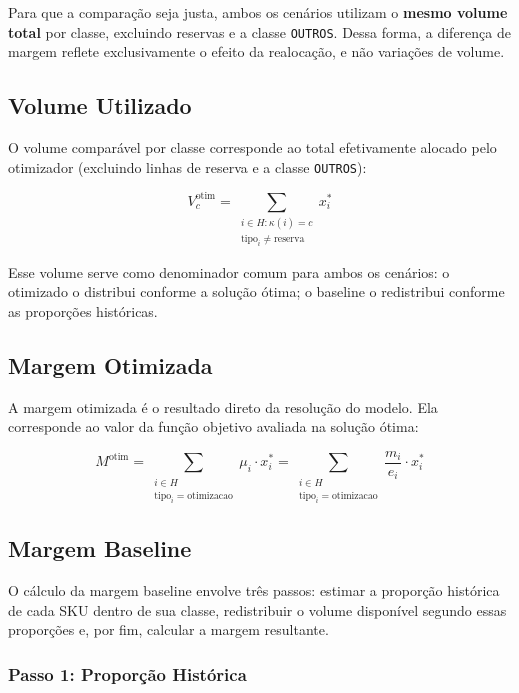 \documentclass[11pt,a4paper]{article}
\begin{document}
Para que a comparação seja justa, ambos os cenários utilizam o \textbf{mesmo
volume total} por classe, excluindo reservas e a classe \texttt{OUTROS}. Dessa
forma, a diferença de margem reflete exclusivamente o efeito da realocação, e
não variações de volume.

\subsection{Volume Utilizado}

O volume comparável por classe corresponde ao total efetivamente alocado pelo
otimizador (excluindo linhas de reserva e a classe \texttt{OUTROS}):

\begin{equation}\label{eq:auto:028}
V_c^{\text{otim}} = \sum_{\substack{i \in H : \kappa(i) = c \\ \text{tipo}_i \neq \text{reserva}}} x_i^*
\end{equation}

Esse volume serve como denominador comum para ambos os cenários: o otimizado o
distribui conforme a solução ótima; o baseline o redistribui conforme as
proporções históricas.

\subsection{Margem Otimizada}

A margem otimizada é o resultado direto da resolução do modelo. Ela corresponde
ao valor da função objetivo avaliada na solução ótima:

\begin{equation}\label{eq:auto:029}
M^{\text{otim}} = \sum_{\substack{i \in H \\ \text{tipo}_i = \text{otimizacao}}} \mu_i \cdot x_i^*
= \sum_{\substack{i \in H \\ \text{tipo}_i = \text{otimizacao}}} \frac{m_i}{e_i} \cdot x_i^*
\end{equation}

\subsection{Margem Baseline}

O cálculo da margem baseline envolve três passos: estimar a proporção histórica
de cada SKU dentro de sua classe, redistribuir o volume disponível segundo
essas proporções e, por fim, calcular a margem resultante.

\subsubsection{Passo 1: Proporção Histórica}
\end{document}
